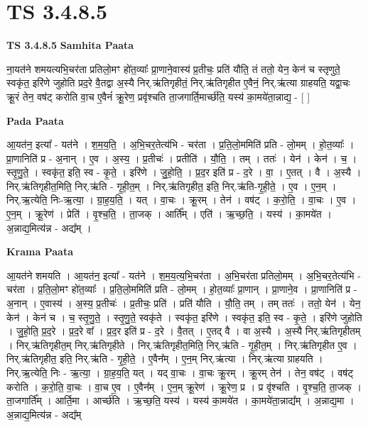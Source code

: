 \documentclass[17pt]{extarticle}
\begin{document}
\section{ TS 3.4.8.5 }

\textbf{TS 3.4.8.5 } \newline
\textbf{Samhita Paata} \newline

ना॒यत॑ने शमयत्यभि॒चर॑ता प्रतिलो॒मꣳ हो॑त॒व्याः᳚ प्रा॒णाने॒वास्य॑ प्र॒तीचः॒ प्रति॑ यौति॒ तं ततो॒ येन॒ केन॑ च स्तृणुते॒ स्वकृ॑त॒ इरि॑णे जुहोति प्रद॒रे वै॒तद्वा अ॒स्यै निर्.ऋ॑तिगृहीतं॒ निर्.ऋ॑तिगृहीत ए॒वैनं॒ निर्.ऋ॑त्या ग्राहयति॒ यद्वा॒चः क्रू॒रं तेन॒ वष॑ट् करोति वा॒च ए॒वैनं॑ क्रू॒रेण॒ प्रवृ॑श्चति ता॒जगार्ति॒मार्च्छ॑ति॒ यस्य॑ का॒मये॑ता॒न्नाद्य॒ - [  ] \newline

\textbf{Pada Paata} \newline

आ॒यत॑न॒ इत्या᳚ - यत॑ने । श॒म॒य॒ति॒ । अ॒भि॒चर॒तेत्य॑भि - चर॑ता । प्र॒ति॒लो॒ममिति॑ प्रति - लो॒मम् । हो॒त॒व्याः᳚ । प्रा॒णानिति॑ प्र - अ॒नान् । ए॒व । अ॒स्य॒ । प्र॒तीचः॑ । प्रतीति॑ । यौ॒ति॒ । तम् । ततः॑ । येन॑ । केन॑ । च॒ । स्तृ॒णु॒ते॒ । स्वकृ॑त॒ इति॒ स्व - कृ॒ते॒ । इरि॑णे । जु॒हो॒ति॒ । प्र॒द॒र इति॑ प्र - द॒रे । वा॒ । ए॒तत् । वै । अ॒स्यै । निर्.ऋ॑तिगृहीत॒मिति॒ निर्.ऋ॑ति - गृ॒ही॒त॒म् । निर्.ऋ॑तिगृहीत॒ इति॒ निर्.ऋ॑ति-गृ॒ही॒ते॒ । ए॒व । ए॒न॒म् । निर्.ऋ॒त्येति॒ निः-ऋ॒त्या॒ । ग्रा॒ह॒य॒ति॒ । यत् । वा॒चः । क्रू॒रम् । तेन॑ । वष॑ट् । क॒रो॒ति॒ । वा॒चः । ए॒व । ए॒न॒म् । क्रू॒रेण॑ । प्रेति॑ । वृ॒श्च॒ति॒ । ता॒जक् । आर्ति᳚म् । एति॑ । ऋ॒च्छ॒ति॒ । यस्य॑ । का॒मये॑त । अ॒न्नाद्य॒मित्य॑न्न - अद्य᳚म् ।  \newline


\textbf{Krama Paata} \newline

आ॒यत॑ने शमयति । आ॒यत॑न॒ इत्या᳚ - यत॑ने । श॒म॒य॒त्य॒भि॒चर॑ता । अ॒भि॒चर॑ता प्रतिलो॒मम् । अ॒भि॒चर॒तेत्य॑भि - चर॑ता । प्र॒ति॒लो॒मꣳ हो॑त॒व्याः᳚ । प्र॒ति॒लो॒ममिति॑ प्रति - लो॒मम् । हो॒त॒व्याः᳚ प्रा॒णान् । प्रा॒णाने॒व । प्रा॒णानिति॑ प्र - अ॒नान् । ए॒वास्य॑ । अ॒स्य॒ प्र॒तीचः॑ । प्र॒तीचः॒ प्रति॑ । प्रति॑ यौति । यौ॒ति॒ तम् । तम् ततः॑ । ततो॒ येन॑ । येन॒ केन॑ । केन॑ च । च॒ स्तृ॒णु॒ते॒ । स्तृ॒णु॒ते॒ स्वकृ॑ते । स्वकृ॑त॒ इरि॑णे । स्वकृ॑त॒ इति॒ स्व - कृ॒ते॒ । इरि॑णे जुहोति । जु॒हो॒ति॒ प्र॒द॒रे । प्र॒द॒रे वा᳚ । प्र॒द॒र इति॑ प्र - द॒रे । वै॒तत् । ए॒तद् वै । वा अ॒स्यै । अ॒स्यै निर्.ऋ॑तिगृहीतम् । निर्.ऋ॑तिगृहीत॒म् निर्.ऋ॑तिगृहीते । निर्.ऋ॑तिगृहीत॒मिति॒ निर्.ऋ॑ति - गृ॒ही॒त॒म् । निर्.ऋ॑तिगृहीत ए॒व । निर्.ऋ॑तिगृहीत॒ इति॒ निर्.ऋ॑ति - गृ॒ही॒ते॒ । ए॒वैन᳚म् । ए॒न॒म् निर्.ऋ॑त्या । निर्.ऋ॑त्या ग्राहयति । निर्.ऋ॒त्येति॒ निः - ऋ॒त्या॒ । ग्रा॒ह॒य॒ति॒ यत् । यद् वा॒चः । वा॒चः क्रू॒रम् । क्रू॒रम् तेन॑ । तेन॒ वष॑ट् । वष॑ट् करोति । क॒रो॒ति॒ वा॒चः । वा॒च ए॒व । ए॒वैन᳚म् । ए॒न॒म् क्रू॒रेण॑ । क्रू॒रेण॒ प्र । प्र वृ॑श्चति । वृ॒श्च॒ति॒ ता॒जक् । ता॒जगार्ति᳚म् । आर्ति॒मा । आर्च्छ॑ति । ऋ॒च्छ॒ति॒ यस्य॑ । यस्य॑ का॒मये॑त । का॒मये॑ता॒न्नाद्य᳚म् । अ॒न्नाद्य॒मा । अ॒न्नाद्य॒मित्य॑न्न - अद्य᳚म् \newline
\end{document}
